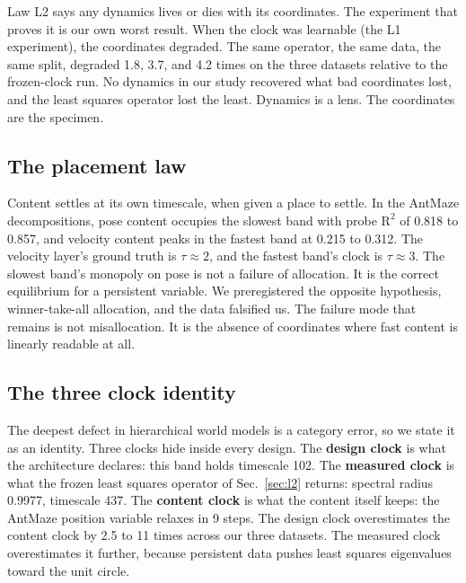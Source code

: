 \documentclass[11pt]{article}
\newcommand{\tauc}{\tau}
\newcommand{\term}[1]{\textbf{#1}}
\begin{document}
Law L2 says any dynamics lives or dies with its coordinates.
The experiment that proves it is our own worst result.
When the clock was learnable (the L1 experiment), the coordinates degraded.
The same operator, the same data, the same split, degraded 1.8, 3.7, and 4.2 times on the three datasets relative to the frozen-clock run.
No dynamics in our study recovered what bad coordinates lost, and the least squares operator lost the least.
Dynamics is a lens.
The coordinates are the specimen.

\subsection{The placement law}
\label{sec:placement}

Content settles at its own timescale, when given a place to settle.
In the AntMaze decompositions, pose content occupies the slowest band with probe $\mathrm{R}^2$ of 0.818 to 0.857, and velocity content peaks in the fastest band at 0.215 to 0.312.
The velocity layer's ground truth is $\tauc \approx 2$, and the fastest band's clock is $\tauc \approx 3$.
The slowest band's monopoly on pose is not a failure of allocation.
It is the correct equilibrium for a persistent variable.
We preregistered the opposite hypothesis, winner-take-all allocation, and the data falsified us.
The failure mode that remains is not misallocation.
It is the absence of coordinates where fast content is linearly readable at all.

\subsection{The three clock identity}
\label{sec:threeclocks}

The deepest defect in hierarchical world models is a category error, so we state it as an identity.
Three clocks hide inside every design.
The \term{design clock} is what the architecture declares: this band holds timescale 102.
The \term{measured clock} is what the frozen least squares operator of Sec.~\ref{sec:l2} returns: spectral radius 0.9977, timescale 437.
The \term{content clock} is what the content itself keeps: the AntMaze position variable relaxes in 9 steps.
The design clock overestimates the content clock by 2.5 to 11 times across our three datasets.
The measured clock overestimates it further, because persistent data pushes least squares eigenvalues toward the unit circle.
\end{document}
